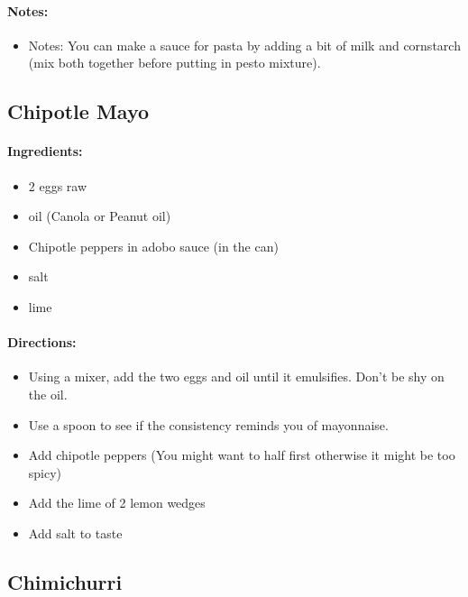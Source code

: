 \documentclass{article}
\begin{document}
\paragraph{Notes:}
\begin{itemize}
	\item Notes: You can make a sauce for pasta by adding a bit of milk and cornstarch (mix both together before putting in pesto mixture).
\end{itemize}

\subsection{Chipotle Mayo}

\paragraph{Ingredients:}

\begin{itemize}
	\item 2 eggs raw
	\item oil (Canola or Peanut oil)
	\item Chipotle peppers in adobo sauce (in the can)
	\item salt
	\item lime
\end{itemize}

\paragraph{Directions:}
\begin{itemize}
	\item Using a mixer, add the two eggs and oil until it emulsifies. Don't be shy on the oil.
	\item Use a spoon to see if the consistency reminds you of mayonnaise.
	\item Add chipotle peppers (You might want to half first otherwise it might be too spicy)
	\item Add the lime of 2 lemon wedges
	\item Add salt to taste
\end{itemize}

\subsection{Chimichurri}
\end{document}
